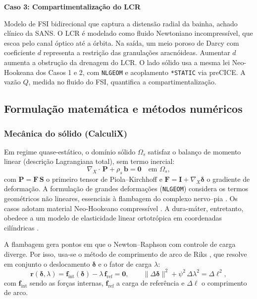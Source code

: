 \documentclass[article, hidelinks,oneside,12pt]{abntex2}
\begin{document}
\textbf{Caso 3: Compartimentalização do LCR}

Modelo de FSI bidirecional que captura a distensão radial da bainha, achado clínico da SANS. O LCR é modelado como fluido Newtoniano incompressível, que escoa pelo canal óptico até a órbita. Na saída, um meio poroso de Darcy com coeficiente $d$ representa a restrição das granulações aracnóideas. Aumentar $d$ aumenta a obstrução da drenagem do LCR. O lado sólido usa a mesma lei Neo-Hookeana dos Casos 1 e 2, com \texttt{NLGEOM} e acoplamento \texttt{*STATIC} via preCICE. A vazão $Q$, medida no fluido do FSI, quantifica a compartimentalização.


\subsection*{Formulação matemática e métodos numéricos}
\label{sec:teoria}

\subsubsection*{Mecânica do sólido (CalculiX)}
\label{sec:teoria-solido}

Em regime quase-estático, o domínio sólido $\Omega_s$ satisfaz o balanço de momento linear (descrição Lagrangiana total), sem termo inercial:
\begin{equation}
  \nabla_{\!X}\!\cdot\,\mathbf{P} + \rho_s\,\mathbf{b} = \mathbf{0}
  \quad\text{em } \Omega_s,
  \label{eq:equilibrio-solido}
\end{equation}
com $\mathbf{P} = \mathbf{F}\,\mathbf{S}$ o primeiro tensor de Piola--Kirchhoff e $\mathbf{F} = \mathbf{I} + \nabla_{\!X}\boldsymbol{\delta}$ o gradiente de deformação. A formulação de grandes deformações (\texttt{NLGEOM}) considera os termos geométricos não lineares, essenciais à flambagem do complexo nervo--pia \cite{bonet2008, belytschko2014}. Os casos adotam material Neo-Hookeano compressível \cite{bonet2008}. A dura-máter, entretanto, obedece a um modelo de elasticidade linear ortotrópica em coordenadas cilíndricas \cite{holzapfel2000}.

A flambagem gera pontos em que o Newton--Raphson com controle de carga diverge. Por isso, usa-se o método de comprimento de arco de Riks \cite{crisfield1991}, que resolve em conjunto o deslocamento $\boldsymbol{\delta}$ e o fator de carga $\lambda$:
\begin{equation}
  \mathbf{r}(\boldsymbol{\delta},\lambda)
  = \mathbf{f}_{\mathrm{int}}(\boldsymbol{\delta}) - \lambda\,\mathbf{f}_{\mathrm{ref}}
  = \mathbf{0},
  \qquad
  \lVert \Delta\boldsymbol{\delta}\rVert^2 + \psi^2\,\Delta\lambda^2 = \Delta\ell^2,
  \label{eq:riks}
\end{equation}
com $\mathbf{f}_{\mathrm{int}}$ sendo as forças internas, $\mathbf{f}_{\mathrm{ref}}$ a carga de referência e $\Delta\ell$ o comprimento de arco.
\end{document}
